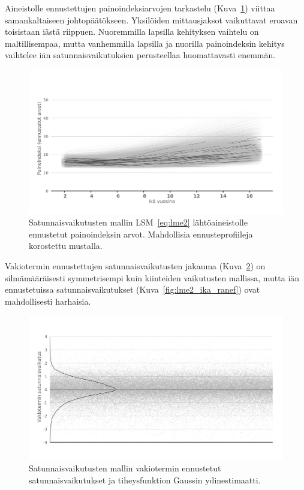 \documentclass[finnish]{docopts}
\begin{document}
Aineistolle ennustettujen painoindeksiarvojen tarkastelu (Kuva~\ref{fig:lme2_bmi_pred}) viittaa samankaltaiseen johtopäätökseen. Yksilöiden mittausjaksot vaikuttavat eroavan toisistaan iästä riippuen. Nuoremmilla lapsilla kehityksen vaihtelu on maltillisempaa, mutta vanhemmilla lapsilla ja nuorilla painoindeksin kehitys vaihtelee iän satunnaisvaikutuksien perusteellaa huomattavasti enemmän.\\

\begin{figure}[H]
\centering
  \includegraphics[scale=0.8]{kuvaajat/lme2_bmi_ennuste.png}
  \caption{Satunnaisvaikutusten mallin LSM~\ref{eq:lme2} lähtöaineistolle ennustetut painoindeksin arvot. Mahdollisia ennusteprofiileja korostettu mustalla.}
  \label{fig:lme2_bmi_pred}
\end{figure}

Vakiotermin ennustettujen satunnaisvaikutusten jakauma (Kuva~\ref{fig:lme2_vakio_ranef}) on silmämääräisesti symmetrisempi kuin kiinteiden vaikutusten mallissa, mutta iän ennustetuissa satunnaisvaikutukset (Kuva~\ref{fig:lme2_ika_ranef}) ovat mahdollisesti harhaisia.\\

\begin{figure}[H]
\centering
  \includegraphics[scale=0.8]{kuvaajat/lme2_vakio_satunnaisvaikutukset.png}
  \caption{Satunnaisvaikutusten mallin vakiotermin ennustetut satunnaisvaikutukset ja tiheysfunktion Gaussin ydinestimaatti.}
  \label{fig:lme2_vakio_ranef}
\end{figure}
\end{document}
